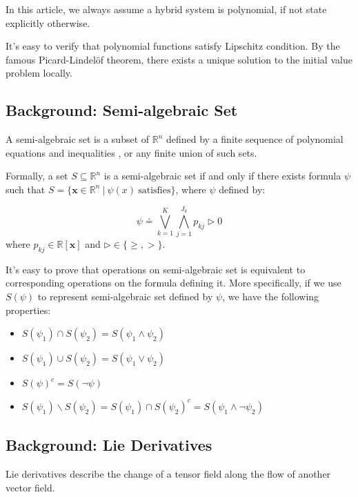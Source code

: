 \documentclass{jssc}
\begin{document}
In this article, we always assume a hybrid system is polynomial, if not state explicitly otherwise.

It's easy to verify that polynomial functions satisfy Lipschitz condition. By the famous Picard-Lindel\"{o}f theorem, there exists a unique solution to the initial value problem locally.

\subsection{Background: Semi-algebraic Set}
\begin{definition}
\label{def:semialgebra}
A semi-algebraic set is a subset of $\mathbb{R}^n$ defined by a finite sequence of polynomial equations and inequalities , or any finite union of such sets.

Formally, a set $S \subseteq \mathbb{R}^n$ is a semi-algebraic set if and only if there exists formula $\psi$ such that $S = \{\boldsymbol{x} \in \mathbb{R}^n\ |\ \psi(x)\ \text{satisfies} \}$,  where $\psi$ defined by:

\begin{displaymath}
	\psi \doteq \bigvee_{k=1}^{K} \bigwedge_{j=1}^{J_k}p_{kj} \rhd 0
\end{displaymath}
where $p_{kj} \in \mathbb{R}[\boldsymbol{x}]$ and $\rhd \in \{\geq, >\}$.
\end{definition}

It's easy to prove that operations on semi-algebraic set is equivalent to corresponding operations on the formula defining it. More specifically, if we use $S(\psi)$ to represent semi-algebraic set defined by $\psi$, we have the following properties:
\begin{itemize}
	\item $S(\psi_1) \cap S(\psi_2) = S(\psi_1 \wedge \psi_2)$
	\item $S(\psi_1) \cup S(\psi_2) = S(\psi_1 \vee \psi_2)$
	\item $S(\psi)^c = S(\neg \psi)$
	\item $S(\psi_1) \backslash S(\psi_2) = S(\psi_1) \cap S(\psi_2)^c = S(\psi_1 \wedge \neg \psi_2)$
\end{itemize}

\subsection{Background: Lie Derivatives}
Lie derivatives describe the change of a tensor field along the flow of another vector field.
\end{document}
